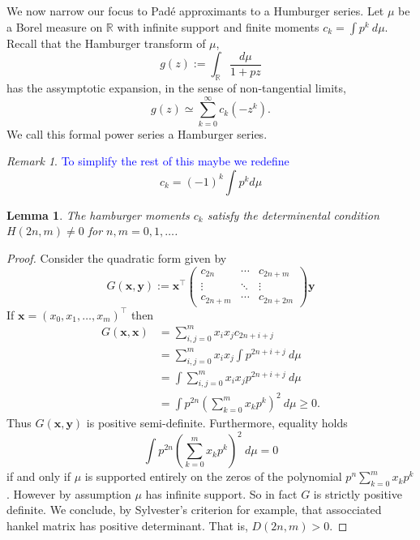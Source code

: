 \documentclass{amsart}
\newtheorem{lemma}[theorem]{Lemma}
\theoremstyle{remark}
\newtheorem{remark}[theorem]{Remark}
\numberwithin{equation}{section}
\newcommand{\tc}{\textcolor{blue}}
\newcommand{\RR}{\mathbb{R}}
\begin{document}
We now narrow our focus to Pad\'e approximants to a Humburger series. Let $\mu$ be a Borel measure on $\RR$ with infinite support and finite moments $c_k = \int p^k ~d\mu$. Recall that the Hamburger transform of $\mu$,
\[
    g(z) := \int_\RR \frac{d\mu}{1+pz}
\]
has the assymptotic expansion, in the sense of non-tangential limits,
\[
    g(z) \simeq \sum_{k=0}^\infty c_k (-z^k).
\]
We call this formal power series a Hamburger series. 

\begin{remark}
    \tc{To simplify the rest of this maybe we redefine}
    \[
        c_k = {(-1)}^k\int p^k d\mu
    \]
\end{remark}

\begin{lemma}
    The hamburger moments $c_k$ satisfy the determinental condition $H(2n, m) \neq 0$ for $n,m = 0, 1, \ldots$. 
\end{lemma}
\begin{proof}
    Consider the quadratic form given by
    \[
        G(\mathbf{x}, \mathbf{y}) := 
        \mathbf{x}^\top
        \begin{pmatrix}
            c_{2n} & \cdots & c_{2n+m} \\
            \vdots & \ddots & \vdots  \\
            c_{2n+m} & \cdots & c_{2n+2m}
        \end{pmatrix}
        \mathbf{y}
    \]
    If $\mathbf{x} = {(x_0, x_1, \ldots, x_m)}^\top$ then
    \begin{align*}
        G(\mathbf{x}, \mathbf{x})
        &= \sum_{i,j=0}^m x_i x_j c_{2n+i+j} \\
        &= \sum_{i,j=0}^m x_i x_j \int p^{2n+i+j} ~d\mu \\
        &= \int \sum_{i,j=0}^m x_i x_j p^{2n+i+j} ~d\mu \\
        &= \int p^{2n} {\left(\sum_{k=0}^m x_k p^{k}\right)}^2 ~d\mu 
        \geq 0.
    \end{align*}
    Thus $G(\mathbf{x}, \mathbf{y})$ is positive semi-definite. Furthermore, equality holds
    \[
        \int p^{2n}{\left(\sum_{k=0}^m x_k p^{k}\right)}^2 ~d\mu = 0
    \]
    if and only if $\mu$ is supported entirely on the zeros of the polynomial $p^n\sum_{k=0}^m x_k p^{k}$. However by assumption $\mu$ has infinite support. So in fact $G$ is strictly positive definite. We conclude, by Sylvester's criterion for example, that assocciated hankel matrix has positive determinant. That is, $D(2n, m) > 0$.
\end{proof}
\end{document}
